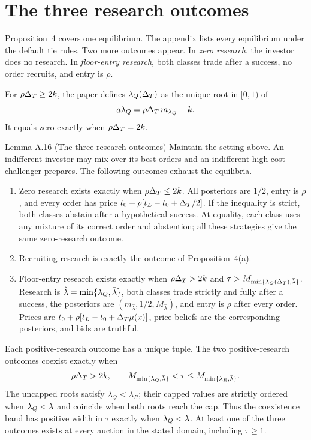 \section{The three research outcomes}\label{sec:research-outcomes}

Proposition~4 covers one equilibrium. The appendix lists every equilibrium under the default tie rules. Two more
outcomes appear. In \emph{zero research}, the investor does no research. In \emph{floor-entry research}, both classes
trade after a success, no order recruits, and entry is \(\rho\).

For \(\rho\Delta_T\ge2k\), the paper defines \(\lambda_Q(\Delta_T)\) as the unique root in \([0,1)\) of
\begin{equation}\label{eq:research-floor}
a\lambda_Q=\rho\Delta_T\,m_{\lambda_Q}-k .
\end{equation}
It equals zero exactly when \(\rho\Delta_T=2k\).

\begin{paperresult}{Lemma A.16 (The three research outcomes)}
Maintain the setting above. An indifferent investor may mix over its best orders and an indifferent high-cost
challenger prepares. The following outcomes exhaust the equilibria.
\begin{enumerate}[label=(\alph*),leftmargin=2em]
\item Zero research exists exactly when \(\rho\Delta_T\le2k\). All posteriors are \(1/2\), entry is \(\rho\), and every order
has price \(t_0+\rho[t_L-t_0+\Delta_T/2]\). If the inequality is strict, both classes abstain after a hypothetical success.
At equality, each class uses any mixture of its correct order and abstention; all these strategies give the same
zero-research outcome.
\item Recruiting research is exactly the outcome of Proposition~4(a).
\item Floor-entry research exists exactly when \(\rho\Delta_T>2k\) and \(\tau>M_{\min\{\lambda_Q(\Delta_T),\bar\lambda\}}\). Research is
\(\hat\lambda=\min\{\lambda_Q,\bar\lambda\}\), both classes trade strictly and fully after a success, the posteriors are
\((m_{\hat\lambda},1/2,M_{\hat\lambda})\), and entry is \(\rho\) after every order. Prices are
\(t_0+\rho[t_L-t_0+\Delta_T\mu(x)]\), price beliefs are the corresponding posteriors, and bids are truthful.
\end{enumerate}
Each positive-research outcome has a unique tuple. The two positive-research outcomes coexist exactly when
\[
\rho\Delta_T>2k,\qquad M_{\min\{\lambda_Q,\bar\lambda\}}<\tau\le M_{\min\{\lambda_R,\bar\lambda\}}.
\]
The uncapped roots satisfy \(\lambda_Q<\lambda_R\); their capped values are strictly ordered when \(\lambda_Q<\bar\lambda\) and
coincide when both roots reach the cap. Thus the coexistence band has positive width in \(\tau\) exactly when
\(\lambda_Q<\bar\lambda\). At least one of the three outcomes exists at every auction in the stated domain, including
\(\tau\ge1\).
\end{paperresult}

